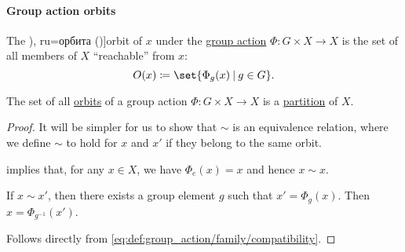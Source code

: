 \paragraph{Group action orbits}

\begin{definition}\label{def:group_action_orbit}
  The \term[bg=орбита (\cite[def. IV.20]{ГеновМиховскиМоллов1991Алгебра}), ru=орбита (\cite[179]{Винберг2014КурсАлгебры})]{orbit} of \( x \) under the \hyperref[def:group_action]{group action} \( \Phi: G \times X \to X \) is the set of all members of \( X \) \enquote{reachable} from \( x \):
  \begin{equation*}
    O(x) \coloneqq \set{ \Phi_g(x) \given g \in G }.
  \end{equation*}
\end{definition}

\begin{proposition}\label{thm:orbit_induces_partition}
  The set of all \hyperref[def:group_action_orbit]{orbits} of a group action \( \Phi: G \times X \to X \) is a \hyperref[def:set_partition]{partition} of \( X \).
\end{proposition}
\begin{proof}
  It will be simpler for us to show that \( {\sim} \) is an equivalence relation, where we define \( {\sim} \) to hold for \( x \) and \( x' \) if they belong to the same orbit.

    implies that, for any \( x \in X \), we have \( \Phi_e(x) = x \) and hence \( x \sim x \).

   If \( x \sim x' \), then there exists a group element \( g \) such that \( x' = \Phi_g(x) \). Then \( x = \Phi_{g^{-1}}(x') \).

   Follows directly from \eqref{eq:def:group_action/family/compatibility}.
\end{proof}

